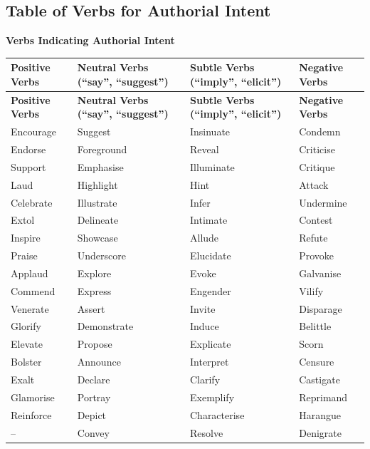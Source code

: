 \documentclass[a4paper]{article}
\begin{document}
\subsection{Table of Verbs for Authorial Intent}

\begin{center}
\textbf{\LARGE Verbs Indicating Authorial Intent}
\end{center}

\begin{longtable}{|p{3cm}|p{3cm}|p{3cm}|p{3cm}|}
\hline
\textbf{Positive Verbs} & \textbf{Neutral Verbs (``say'', ``suggest'')} & \textbf{Subtle Verbs (``imply'', ``elicit'')} & \textbf{Negative Verbs} \\
\hline
\endfirsthead

\hline
\textbf{Positive Verbs} & \textbf{Neutral Verbs (``say'', ``suggest'')} & \textbf{Subtle Verbs (``imply'', ``elicit'')} & \textbf{Negative Verbs} \\
\hline
\endhead

Encourage & Suggest & Insinuate & Condemn \\
Endorse & Foreground & Reveal & Criticise \\
Support & Emphasise & Illuminate & Critique \\
Laud & Highlight & Hint & Attack \\
Celebrate & Illustrate & Infer & Undermine \\
Extol & Delineate & Intimate & Contest \\
Inspire & Showcase & Allude & Refute \\
Praise & Underscore & Elucidate & Provoke \\
Applaud & Explore & Evoke & Galvanise \\
Commend & Express & Engender & Vilify \\
Venerate & Assert & Invite & Disparage \\
Glorify & Demonstrate & Induce & Belittle \\
Elevate & Propose & Explicate & Scorn \\
Bolster & Announce & Interpret & Censure \\
Exalt & Declare & Clarify & Castigate \\
Glamorise & Portray & Exemplify & Reprimand \\
Reinforce & Depict & Characterise & Harangue \\
-- & Convey & Resolve & Denigrate \\
\hline

\end{longtable}
\end{document}
